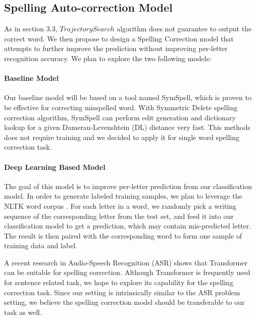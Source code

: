 \documentclass{article}
\begin{document}
\begin{multicols*}{2}
\subsection{Spelling Auto-correction Model}
As in section 3.3, $TrajectorySearch$ algorithm does not guarantee to output the correct word. We then propose to design a Spelling Correction model that attempts to further improve the prediction without improving per-letter recognition accuracy. We plan to explore the two following models:

\paragraph{Baseline Model} Our baseline model will be based on a tool named SymSpell, which is proven \cite{SymSpell} to be effective for correcting misspelled word. With Symmetric Delete spelling correction algorithm, SymSpell can perform edit generation and dictionary lookup for a given Damerau-Levenshtein (DL) distance very fast. This methods does not require training and we decided to apply it for single word spelling correction task.

\paragraph{Deep Learning Based Model} The goal of this model is to improve per-letter prediction from our classification model. In order to generate labeled training samples, we plan to leverage the NLTK word corpus \cite{nltk}. For each letter in a word, we randomly pick a writing sequence of the corresponding letter from the test set, and feed it into our classification model to get a prediction, which may contain mis-predicted letter. The result is then paired with the corresponding word to form one sample of training data and label. 

A recent research \cite{Zhang2019InvestigationOT} in Audio-Speech Recognition (ASR) shows that Transformer can be suitable for spelling correction. Although Transformer is frequently used for sentence related task, we hope to explore its capability for the spelling correction task. Since our setting is intrinsically similar to the ASR problem setting, we believe the spelling correction model should be transferable to our task as well.




\end{multicols*}
\end{document}
